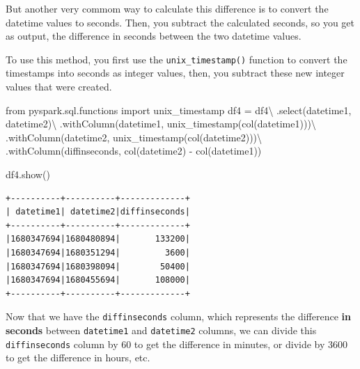 \documentclass[
  11pt,
  letterpaper,
  DIV=11,
  numbers=noendperiod]{scrreprt}
\newenvironment{Shaded}{\begin{snugshade}}{\end{snugshade}}
\newcommand{\ImportTok}[1]{\textcolor[rgb]{0.00,0.46,0.62}{#1}}
\newcommand{\NormalTok}[1]{\textcolor[rgb]{0.00,0.23,0.31}{#1}}
\newcommand{\OperatorTok}[1]{\textcolor[rgb]{0.37,0.37,0.37}{#1}}
\newcommand{\StringTok}[1]{\textcolor[rgb]{0.13,0.47,0.30}{#1}}
\begin{document}
But another very commom way to calculate this difference is to convert
the datetime values to seconds. Then, you subtract the calculated
seconds, so you get as output, the difference in seconds between the two
datetime values.

To use this method, you first use the \texttt{unix\_timestamp()}
function to convert the timestamps into seconds as integer values, then,
you subtract these new integer values that were created.

\begin{Shaded}
\begin{Highlighting}[]
\ImportTok{from}\NormalTok{ pyspark.sql.functions }\ImportTok{import}\NormalTok{ unix\_timestamp}
\NormalTok{df4 }\OperatorTok{=}\NormalTok{ df4}\OperatorTok{\textbackslash{}}
\NormalTok{    .select(}\StringTok{\textquotesingle{}datetime1\textquotesingle{}}\NormalTok{, }\StringTok{\textquotesingle{}datetime2\textquotesingle{}}\NormalTok{)}\OperatorTok{\textbackslash{}}
\NormalTok{    .withColumn(}\StringTok{\textquotesingle{}datetime1\textquotesingle{}}\NormalTok{, unix\_timestamp(col(}\StringTok{\textquotesingle{}datetime1\textquotesingle{}}\NormalTok{)))}\OperatorTok{\textbackslash{}}
\NormalTok{    .withColumn(}\StringTok{\textquotesingle{}datetime2\textquotesingle{}}\NormalTok{, unix\_timestamp(col(}\StringTok{\textquotesingle{}datetime2\textquotesingle{}}\NormalTok{)))}\OperatorTok{\textbackslash{}}
\NormalTok{    .withColumn(}\StringTok{\textquotesingle{}diffinseconds\textquotesingle{}}\NormalTok{, col(}\StringTok{\textquotesingle{}datetime2\textquotesingle{}}\NormalTok{) }\OperatorTok{{-}}\NormalTok{ col(}\StringTok{\textquotesingle{}datetime1\textquotesingle{}}\NormalTok{))}

\NormalTok{df4.show()}
\end{Highlighting}
\end{Shaded}

\begin{verbatim}
+----------+----------+-------------+
| datetime1| datetime2|diffinseconds|
+----------+----------+-------------+
|1680347694|1680480894|       133200|
|1680347694|1680351294|         3600|
|1680347694|1680398094|        50400|
|1680347694|1680455694|       108000|
+----------+----------+-------------+
\end{verbatim}

Now that we have the \texttt{diffinseconds} column, which represents the
difference \textbf{in seconds} between \texttt{datetime1} and
\texttt{datetime2} columns, we can divide this \texttt{diffinseconds}
column by 60 to get the difference in minutes, or divide by 3600 to get
the difference in hours, etc.
\end{document}
